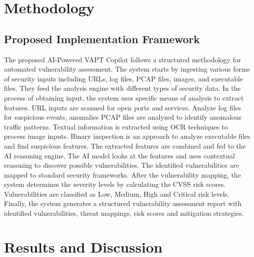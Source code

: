 \documentclass[runningheads]{llncs}
\begin{document}
\section{Methodology}

\subsection{Proposed Implementation Framework}
The proposed AI-Powered VAPT Copilot follows a structured methodology for automated vulnerability assessment. The system starts by ingesting various forms of security inputs including URLs, log files, PCAP files, images, and executable files. They feed the analysis engine with different types of security data. In the process of obtaining input, the system uses specific means of analysis to extract features. URL inputs are scanned for open ports and services. Analyze log files for suspicious events, anomalies PCAP files are analyzed to identify anomalous traffic patterns. Textual information is extracted using OCR techniques to process image inputs. Binary inspection is an approach to analyze executable files and find suspicious features. The extracted features are combined and fed to the AI reasoning engine. The AI model looks at the features and uses contextual reasoning to discover possible vulnerabilities. The identified vulnerabilities are mapped to standard security frameworks. After the vulnerability mapping, the system determines the severity levels by calculating the CVSS risk scores. Vulnerabilities are classified as Low, Medium, High and Critical risk levels. Finally, the system generates a structured vulnerability assessment report with identified vulnerabilities, threat mappings, risk scores and mitigation strategies.

\section{Results and Discussion}
\end{document}
